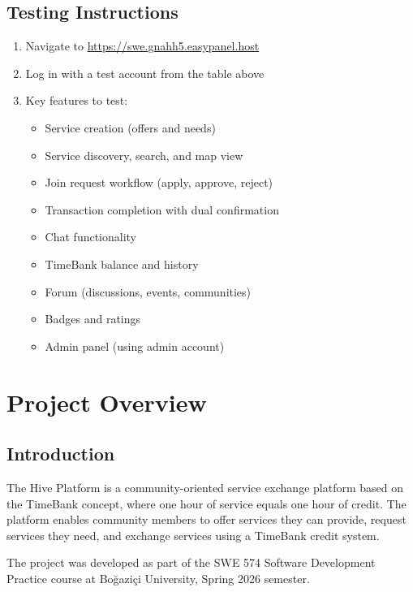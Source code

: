 \documentclass[11pt,a4paper]{report}
\begin{document}
\section{Testing Instructions}

\begin{enumerate}
    \item Navigate to \url{https://swe.gnahh5.easypanel.host}
    \item Log in with a test account from the table above
    \item Key features to test:
          \begin{itemize}
              \item Service creation (offers and needs)
              \item Service discovery, search, and map view
              \item Join request workflow (apply, approve, reject)
              \item Transaction completion with dual confirmation
              \item Chat functionality
              \item TimeBank balance and history
              \item Forum (discussions, events, communities)
              \item Badges and ratings
              \item Admin panel (using admin account)
          \end{itemize}
\end{enumerate}

\chapter{Project Overview}

\section{Introduction}

The Hive Platform is a community-oriented service exchange platform based on the TimeBank concept, where one hour of service equals one hour of credit. The platform enables community members to offer services they can provide, request services they need, and exchange services using a TimeBank credit system.

The project was developed as part of the SWE 574 Software Development Practice course at Bo\u{g}azi\c{c}i University, Spring 2026 semester.
\end{document}
